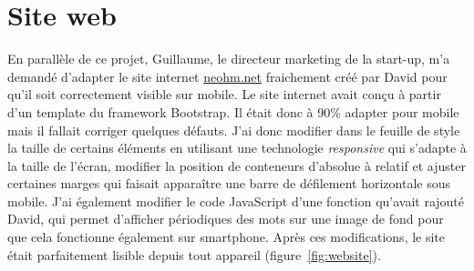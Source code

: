 \documentclass[a4paper, 11pt]{report}
\begin{document}
\section{Site web}
En parallèle de ce projet, Guillaume, le directeur marketing de la start-up, m’a demandé d’adapter le site internet \url{neohm.net} fraichement créé par David pour qu’il soit correctement visible sur mobile.
Le site internet avait conçu à partir d’un template du framework Bootstrap. Il était donc à 90\% adapter pour mobile mais il fallait corriger quelques défauts. J’ai donc modifier dans le feuille de style la taille de certains éléments en utilisant une technologie \emph{responsive} qui s’adapte à la taille de l’écran, modifier la position de conteneurs d’absolue à relatif et ajuster certaines marges qui faisait apparaître une barre de défilement horizontale sous mobile. J’ai également modifier le code JavaScript d’une fonction qu’avait rajouté David, qui permet d’afficher périodiques des mots sur une image de fond pour que cela fonctionne également sur smartphone. Après ces modifications, le site était parfaitement lisible depuis tout appareil (figure~\ref{fig:website}).
\end{document}
